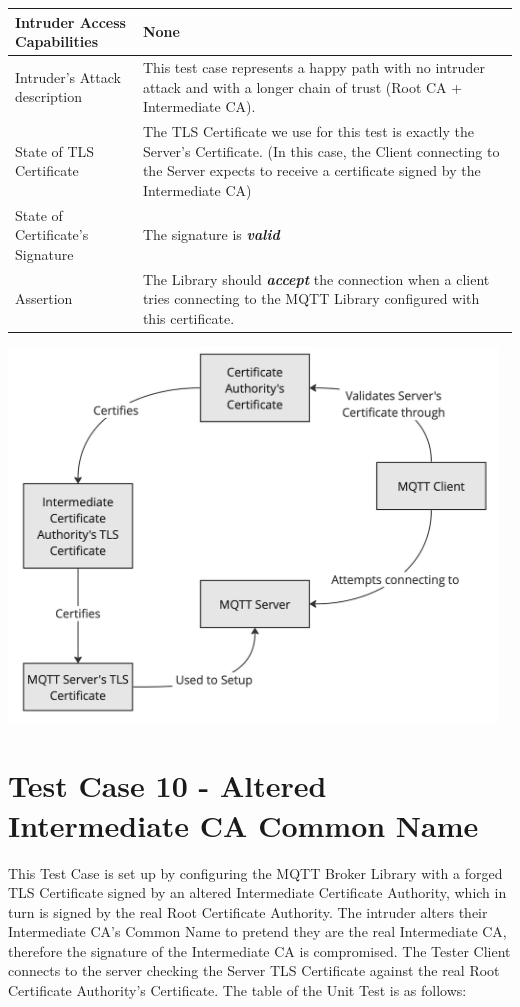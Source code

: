 \documentclass[binding=0.6cm,noexaminfo]{sapthesis}
\begin{document}
\begin{center}
\begin{tabular}{| p{6cm} | p{6cm} |}
\hline
Intruder Access Capabilities & None \\
\hline
Intruder’s Attack description & This test case represents a happy path with no intruder attack and with a longer chain of trust (Root CA + Intermediate CA). \\
\hline
State of TLS Certificate & The TLS Certificate we use for this test is exactly the Server’s Certificate. (In this case, the Client connecting to the Server expects to receive a certificate signed by the Intermediate CA) \\
\hline
State of Certificate’s Signature & The signature is \textbf{\textit{valid}} \\
\hline
Assertion & The Library should \textbf{\textit{accept}} the connection when a client tries connecting to the MQTT Library configured with this certificate. \\
\hline
\end{tabular}
\end{center}

\includegraphics[width=13cm]{TC9}

\section{Test Case 10 - Altered Intermediate CA Common Name}
This Test Case is set up by configuring the MQTT Broker Library with a forged TLS Certificate signed by an altered Intermediate Certificate Authority, which in turn is signed by the real Root Certificate Authority. The intruder alters their Intermediate CA’s Common Name to pretend they are the real Intermediate CA, therefore the signature of the Intermediate CA is compromised. The Tester Client connects to the server checking the Server TLS Certificate against the real Root Certificate Authority’s Certificate. The table of the Unit Test is as follows:
\end{document}
